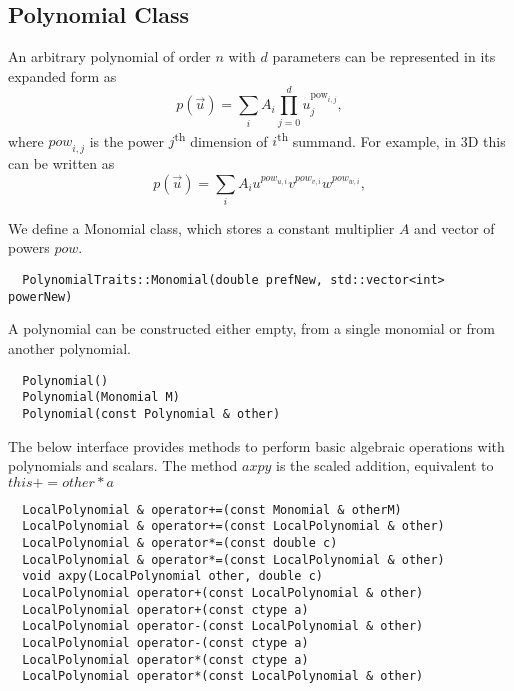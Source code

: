 \subsection{Polynomial Class}
\label{interface-geometry-polynomial}

\noindent
An arbitrary polynomial of order $n$ with $d$ parameters can be represented in its expanded form as
\[ p(\vec{u}) = \sum_i A_i \prod_{j = 0}^d u_j^{\mathrm{pow}_{i,j}},  \]
where ${pow}_{i,j}$ is the power $j$\textsuperscript{th} dimension of $i$\textsuperscript{th} summand. For example, in 3D this can be written as
\[ p(\vec{u}) = \sum_i A_i u^{pow_{u,i}} v^{pow_{v,i}} w^{pow_{w, i}},  \]

\noindent
We define a Monomial class, which stores a constant multiplier $A$ and vector of powers $pow$. \\

\begin{mybox}
\begin{lstlisting}
  PolynomialTraits::Monomial(double prefNew, std::vector<int> powerNew)
\end{lstlisting}
\end{mybox}

\noindent
A polynomial can be constructed either empty, from a single monomial or from another polynomial. \\

\begin{mybox}
\begin{lstlisting}
  Polynomial()
  Polynomial(Monomial M)
  Polynomial(const Polynomial & other)
\end{lstlisting}
\end{mybox}

\noindent
The below interface provides methods to perform basic algebraic operations with polynomials and scalars. The method $axpy$ is the scaled addition, equivalent to $this += other * a$ \\

\begin{mybox}
\begin{lstlisting}
  LocalPolynomial & operator+=(const Monomial & otherM)
  LocalPolynomial & operator+=(const LocalPolynomial & other)
  LocalPolynomial & operator*=(const double c)  
  LocalPolynomial & operator*=(const LocalPolynomial & other)  
  void axpy(LocalPolynomial other, double c)
  LocalPolynomial operator+(const LocalPolynomial & other)
  LocalPolynomial operator+(const ctype a)  
  LocalPolynomial operator-(const LocalPolynomial & other)  
  LocalPolynomial operator-(const ctype a)  
  LocalPolynomial operator*(const ctype a)  
  LocalPolynomial operator*(const LocalPolynomial & other)
\end{lstlisting}
\end{mybox}

